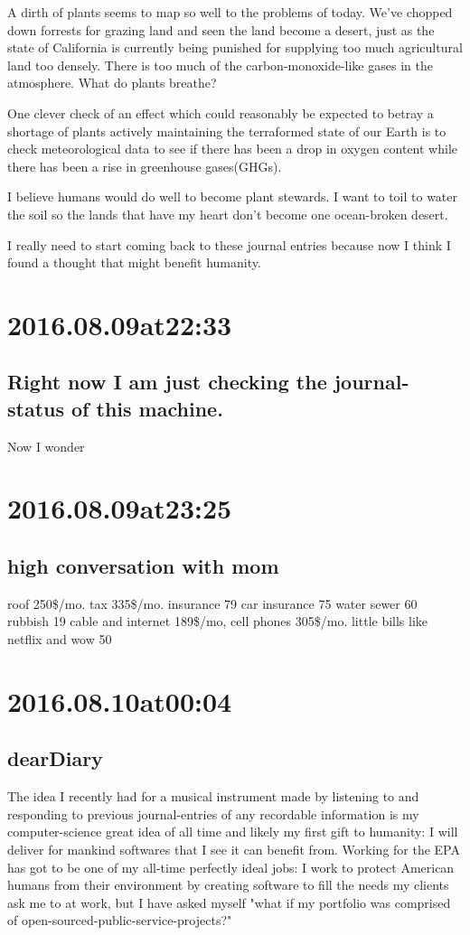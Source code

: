 \begin{enumerate}
\begin{enumerate}
A dirth of plants seems to map so well to the problems of today. We've chopped down forrests for grazing land and seen the land become a desert, just as the state of California is currently being punished for supplying too much agricultural land too densely. There is too much of the carbon-monoxide-like gases in the atmosphere. What do plants breathe?

One clever check of an effect which could reasonably be expected to betray a shortage of plants actively maintaining the terraformed state of our Earth is to check meteorological data to see if there has been a drop in oxygen content while there has been a rise in greenhouse gases(GHGs).

I believe humans would do well to become plant stewards. I want to toil to water the soil so the lands that have my heart don't become one ocean-broken desert.

I really need to start coming back to these journal entries because now I think I found a thought that might benefit humanity.

\section*{ 2016.08.09at22:33 }
\subsection*{ Right now I am just checking the journal-status of this machine. }
Now I wonder 

\section*{ 2016.08.09at23:25 }
\subsection*{ high conversation with mom }
roof 250\$/mo.
tax 335\$/mo.
insurance 79
car insurance 75
water sewer 60
rubbish 19
cable and internet 189\$/mo,
cell phones 305\$/mo.
little bills like netflix and wow 50

\section*{ 2016.08.10at00:04 }
\subsection*{ dearDiary }
The idea I recently had for a musical instrument made by listening to and responding to previous journal-entries of any recordable information is my computer-science great idea of all time and likely my first gift to humanity: I will deliver for mankind softwares that I see it can benefit from. Working for the EPA has got to be one of my all-time perfectly ideal jobs: I work to protect American humans from their environment by creating software to fill the needs my clients ask me to at work, but I have asked myself "what if my portfolio was comprised of open-sourced-public-service-projects?"


\end{enumerate}
\end{enumerate}
